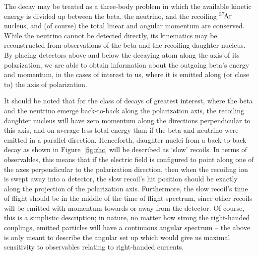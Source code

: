 The decay may be treated as a three-body problem in which the available kinetic energy is divided up between the beta, the neutrino, and the recoiling $^{37}\textrm{\!Ar}$ nucleus, and (of course) the total linear and angular momentum are conserved.  While the neutrino cannot be detected directly, its kinematics may be reconstructed from observations of the beta and the recoiling daughter nucleus.  By placing detectors above and below the decaying atom along the axis of its polarization, we are able to obtain information about the outgoing beta's energy and momentum, in the cases of interest to us, where it is emitted along (or close to) the axis of polarization.  

It should be noted that for the class of decays of greatest interest, where the beta and the neutrino emerge back-to-back along the polarization axis, the recoiling daughter nucleus will have zero momentum along the directions perpendicular to this axis, and on average less total energy than if the beta and neutrino were emitted in a parallel direction.  Henceforth, daughter nuclei from a back-to-back decay as shown in Figure~\ref{fig:rhc} will be described as `slow' recoils.  In terms of observables, 
this means that if the electric field is configured to point along one of the axes perpendicular to the polarization direction, then when the recoiling ion is swept away into a detector, the slow recoil's hit position should be exactly along the projection of the polarization axis.  Furthermore, the slow recoil's time of flight should be in the middle of the time of flight spectrum, since other recoils will be emitted with momentum towards or away from the detector.  Of course, this is a simplistic description; in nature, no matter how strong the right-handed couplings, emitted particles will have a continuous angular spectrum -- the above is only meant to describe the angular set up which would give us maximal sensitivity to observables relating to right-handed currents.  

